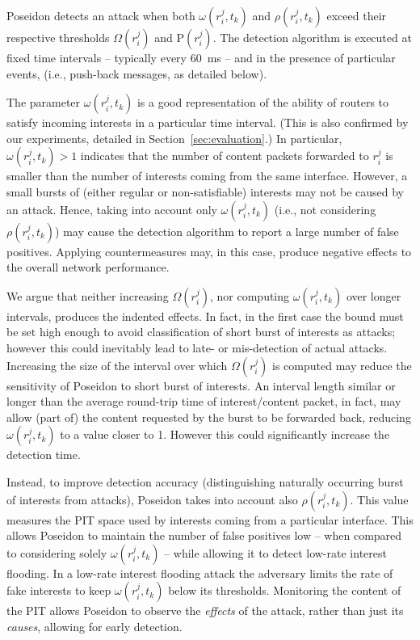 \documentclass[10pt,conference,letterpaper]{IEEEtran}
\newcommand{\Rho}{\mathrm{P}}
\begin{document}
Poseidon detects an attack when both $\omega(r_i^j, t_k)$ and $\rho(r_i^j, t_k)$ exceed their respective thresholds $\Omega(r_i^j)$ and $\Rho(r_i^j)$.
The detection algorithm is executed at fixed time intervals -- typically every 60~ms -- and in the presence of particular events, (i.e., push-back messages, as detailed below).

The parameter $\omega(r_i^j, t_k)$  is a good representation of the ability of routers to 
satisfy incoming interests in a particular time interval. (This is also confirmed by our 
experiments, detailed in Section~\ref{sec:evaluation}.) 
In particular, $\omega(r_i^j, t_k)>1$ indicates that the number of content packets 
forwarded to   $r_i^j$ is smaller than the number of interests coming from the same 
interface. However, a small bursts of (either regular or non-satisfiable) interests may 
not be caused by an attack.
Hence, taking into account only $\omega(r_i^j, t_k)$ (i.e., not considering $\rho(r_i^j, t_k)$) may cause the detection algorithm to 
report a large number of false positives. 
Applying countermeasures may, in this case, produce negative effects to the 
overall network performance.

We argue that neither increasing $\Omega(r_i^j)$, nor computing $\omega(r_i^j, t_k)$ over 
longer intervals, produces the indented effects. In fact, in the 
first case the bound must be set high enough to avoid classification of short  burst of 
interests  as  attacks; however this could inevitably lead to late- or mis-detection of 
actual attacks. 
Increasing the size of the interval over which  $\Omega(r_i^j)$ is computed may reduce the 
sensitivity of Poseidon to short burst of interests. An interval length similar or longer 
than the average round-trip time of interest/content packet, in fact, may allow (part of) 
the content requested by the burst to be forwarded back, reducing $\omega(r_i^j, t_k)$ to 
a value closer to 1.
However this could significantly increase the detection time.
 

Instead, to improve detection accuracy (distinguishing naturally occurring burst of 
interests from attacks), Poseidon takes into account also $\rho(r_i^j, t_k)$. This value 
measures the PIT space used by interests coming from a particular interface.  
This allows Poseidon to maintain the number of false positives low -- when compared to 
considering solely $\omega(r_i^j, t_k)$ -- while allowing it to detect low-rate interest flooding. 
In a low-rate interest flooding attack the adversary limits the rate of fake interests to keep $\omega(r_i^j, 
t_k)$ below its thresholds. Monitoring the content of the PIT allows Poseidon to observe 
the {\em effects} of the attack, rather than just its {\em causes}, allowing for early detection.
\end{document}
